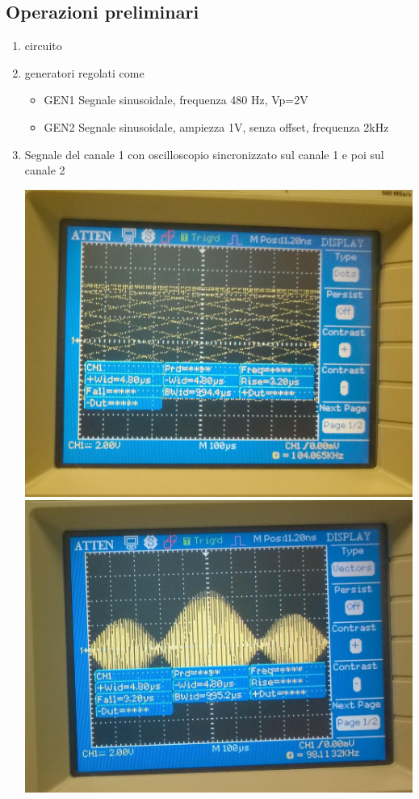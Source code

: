 \documentclass[a4paper]{article}
\begin{document}
\subsection{Operazioni preliminari}
 \begin{enumerate}
  \item circuito
  \item generatori regolati come
   \begin{itemize}
     \item GEN1 Segnale sinusoidale, frequenza 480 Hz, Vp=2V
     \item GEN2 Segnale sinusoidale, ampiezza 1V, senza offset, frequenza 2kHz
   \end{itemize}
  \item Segnale del canale 1 con oscilloscopio sincronizzato sul canale 1 e poi sul canale 2

\begin{center}
    \includegraphics[scale=0.115]{foto/WP_20141009_025.jpg}
  \endminipage
    \includegraphics[scale=0.14]{foto/WP_20141009_026.jpg}
  \endminipage
\end{center}


\end{enumerate}
\end{document}
